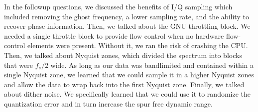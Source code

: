\documentclass{article}
\begin{document}
In the followup questions, we discussed the benefits of I/Q sampling which included removing the ghost frequency, a lower sampling rate, and the ability to recover phase information. Then, we talked about the GNU throttling block. We needed a single throttle block to provide flow control when no hardware flow-control elements were present. Without it, we ran the risk of crashing the CPU. Then, we talked about Nyquist zones, which divided the spectrum into blocks that were $f_s/2$ wide. As long as our data was bandlimited and contained within a single Nyquist zone, we learned that we could sample it in a higher Nyquist zones and allow the data to wrap back into the first Nyquist zone. Finally, we talked about dither noise. We specifically learned that we could use it to randomize the quantization error and in turn increase the spur free dynamic range.


\end{document}
